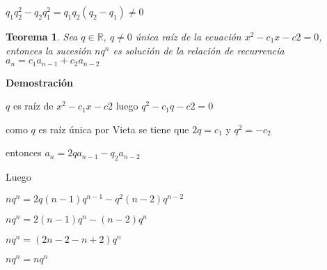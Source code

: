 \documentclass[a4paper,12pt]{report}
\newtheorem*{teo}{Teorema}
\begin{document}
$q_1q^2_2-q_2q^2_1=q_1q_2(q_2-q_1)\neq0$




\begin{teo}
 Sea $q\in\mathbb{R}$, $q\neq 0$ única raíz de la ecuación $x^2-c_1x-c2=0$, entonces la sucesión $nq^n$  es solución de la relación de recurrencia $a_n=c_1a_{n-1}+c_2a_{n-2}$
\end{teo}

\textbf{Demostración}

$q$ es raíz de $x^2-c_1x-c2$ luego $q^2-c_1q-c2=0$

como $q$ es raíz única por Vieta se tiene que $2q=c_1$ y $q^2=-c_2$

entonces $a_n=2qa_{n-1}-q_2a_{n-2}$

Luego 

$nq^n=2q(n-1)q^{n-1}-q^2(n-2)q^{n-2}$

$nq^n=2(n-1)q^{n}-(n-2)q^{n}$

$nq^n=(2n-2-n+2)q^{n}$

$nq^n=nq^n$
   
\end{document}
